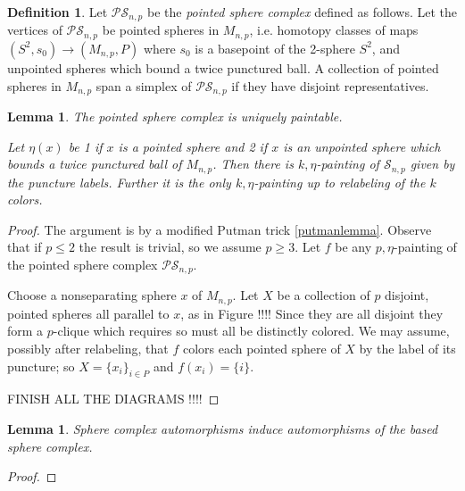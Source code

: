 \documentclass[11pt]{article}
\newtheorem{lemma}[theorem]{Lemma}
\theoremstyle{remark}
\theoremstyle{definition}
\newtheorem{definition}[theorem]{Definition}
\begin{document}
\begin{definition}
  Let $\mathcal{PS}_{n,p}$
  be the \emph{pointed sphere complex} defined as follows.
  Let the vertices of $\mathcal{PS}_{n,p}$
  be pointed spheres in $M_{n,p}$, i.e. homotopy classes of maps
  $(S^2,s_0) \to (M_{n,p},P)$ where $s_0$ is a basepoint of the 2-sphere $S^2$, and unpointed spheres which bound a twice punctured ball.
  A collection of pointed spheres in $M_{n,p}$ span a simplex
  of $\mathcal{PS}_{n,p}$ if they have disjoint representatives.
\end{definition}

\begin{lemma}
  The pointed sphere complex is uniquely paintable.

  Let $\eta(x)$ be 1 if $x$ is a pointed sphere and 2 if $x$ is an unpointed sphere which bounds a twice punctured ball of $M_{n,p}$.
  Then there is $k,\eta$-painting of $\mathcal S_{n,p}$ given by the puncture labels.
  Further it is the only $k,\eta$-painting up to relabeling of the $k$ colors.
  \label{lemma:outpaint}
\end{lemma}

\begin{proof}
  The argument is by a modified Putman trick \ref{putmanlemma}.
  Observe that if $p \leq 2$ the result is trivial, so we assume $p \geq 3$.
  Let $f$ be any $p,\eta$-painting of the pointed sphere complex $\mathcal{PS}_{n,p}$.

  Choose a nonseparating sphere $x$ of $M_{n,p}$.
  Let $X$ be a collection of $p$ disjoint, pointed spheres all parallel to $x$, as in Figure !!!!
  Since they are all disjoint they form a $p$-clique which requires so must all be distinctly colored.
  We may assume, possibly after relabeling, that $f$ colors each
  pointed sphere of $X$ by the label of its puncture; so $X = \{x_i\}_{i\in P}$ and $f(x_i)=\{i\}$.

 FINISH ALL THE DIAGRAMS
  !!!!
\end{proof}

\begin{lemma}
  Sphere complex automorphisms induce automorphisms of the based sphere complex.
  \label{lemma:outbasedspheres}
\end{lemma}

\begin{proof}
\end{proof}
\end{document}
